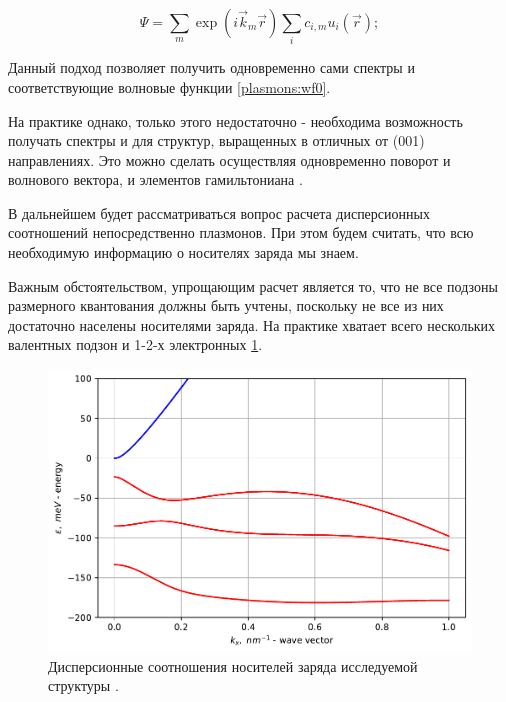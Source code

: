 \documentclass[../main.tex]{subfiles}
\begin{document}
    \begin{equation}
        \label{calculation:wf}
        \Psi = \sum_m \exp(i \vec{k}_{m} \vec r) \sum_{i}  c_{i,m} u_i(\vec r);
    \end{equation}

    Данный подход позволяет получить одновременно сами спектры и соответствующие 
    волновые функции \ref{plasmons:wf0}.

    На практике однако, только этого недостаточно - необходима возможность
    получать спектры и для структур, выращенных в отличных от (001) направлениях.
    Это можно сделать осуществляя одновременно поворот и волнового вектора, и 
    элементов гамильтониана \cite{HgCdTeCalcZholudev}.

    В дальнейшем будет рассматриваться вопрос расчета дисперсионных соотношений
    непосредственно плазмонов. При этом будем считать, что всю необходимую 
    информацию о носителях заряда мы знаем.

    Важным обстоятельством, упрощающим расчет является то, что не все подзоны размерного 
    квантования должны быть учтены, поскольку не все из них достаточно населены 
    носителями заряда. На практике хватает всего нескольких валентных подзон и 1-2-х 
    электронных \ref{spectre}. 


    \begin{figure}[h]
        \begin{minipage}[h]{1\textwidth}
            \includegraphics[width=1\textwidth]{./images/6-0-1-4.2-energy.pdf}
            \caption{Дисперсионные соотношения носителей заряда 
                                        исследуемой структуры \label{spectre}.}
        \end{minipage}
    \end{figure}
\end{document}
